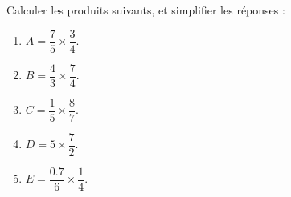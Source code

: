 
\begin{exercice}\label{exosmath-0875}

    Calculer les produits suivants, et simplifier les réponses :
    \begin{multicols}{2}
        \begin{enumerate}
            \item
                \( A=\dfrac{ 7 }{ 5 }\times \dfrac{ 3 }{ 4 }\).
            \item
                \( B=\dfrac{ 4 }{ 3 }\times \dfrac{ 7 }{ 4 }\).
            \item
                \( C=\dfrac{ 1 }{ 5 }\times \dfrac{ 8 }{ 7 }\).
            \item
                \( D=5\times \dfrac{ 7 }{ 2 }\).
            \item
                \( E=\dfrac{ 0.7 }{ 6 }\times \dfrac{ 1 }{ 4 }\).
        \end{enumerate}
    \end{multicols}

\end{exercice}
